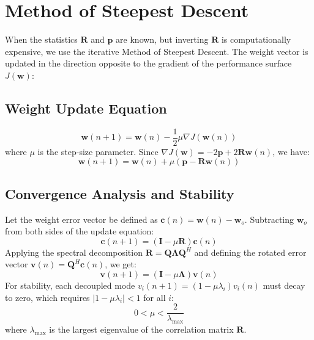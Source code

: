 \documentclass[12pt,a4paper]{article}
\begin{document}
\section{Method of Steepest Descent}

When the statistics $\mathbf{R}$ and $\mathbf{p}$ are known, but inverting $\mathbf{R}$ is computationally expensive, we use the iterative Method of Steepest Descent. The weight vector is updated in the direction opposite to the gradient of the performance surface $J(\mathbf{w})$:

\subsection{Weight Update Equation}
\begin{equation}
  \mathbf{w}(n+1) = \mathbf{w}(n) - \frac{1}{2} \mu \nabla J(\mathbf{w}(n))
\end{equation}
where $\mu$ is the step-size parameter. Since $\nabla J(\mathbf{w}) = -2\mathbf{p} + 2\mathbf{R}\mathbf{w}(n)$, we have:
\begin{equation}
  \mathbf{w}(n+1) = \mathbf{w}(n) + \mu (\mathbf{p} - \mathbf{R} \mathbf{w}(n))
\end{equation}

\subsection{Convergence Analysis and Stability}
Let the weight error vector be defined as $\mathbf{c}(n) = \mathbf{w}(n) - \mathbf{w}_o$. Subtracting $\mathbf{w}_o$ from both sides of the update equation:
\begin{equation}
  \mathbf{c}(n+1) = (\mathbf{I} - \mu \mathbf{R})\mathbf{c}(n)
\end{equation}
Applying the spectral decomposition $\mathbf{R} = \mathbf{Q} \mathbf{\Lambda} \mathbf{Q}^H$ and defining the rotated error vector $\mathbf{v}(n) = \mathbf{Q}^H \mathbf{c}(n)$, we get:
\begin{equation}
  \mathbf{v}(n+1) = (\mathbf{I} - \mu \mathbf{\Lambda})\mathbf{v}(n)
\end{equation}
For stability, each decoupled mode $v_i(n+1) = (1 - \mu \lambda_i)v_i(n)$ must decay to zero, which requires $|1 - \mu \lambda_i| < 1$ for all $i$:
\begin{equation}
  0 < \mu < \frac{2}{\lambda_{\text{max}}}
\end{equation}
where $\lambda_{\text{max}}$ is the largest eigenvalue of the correlation matrix $\mathbf{R}$.
\end{document}
